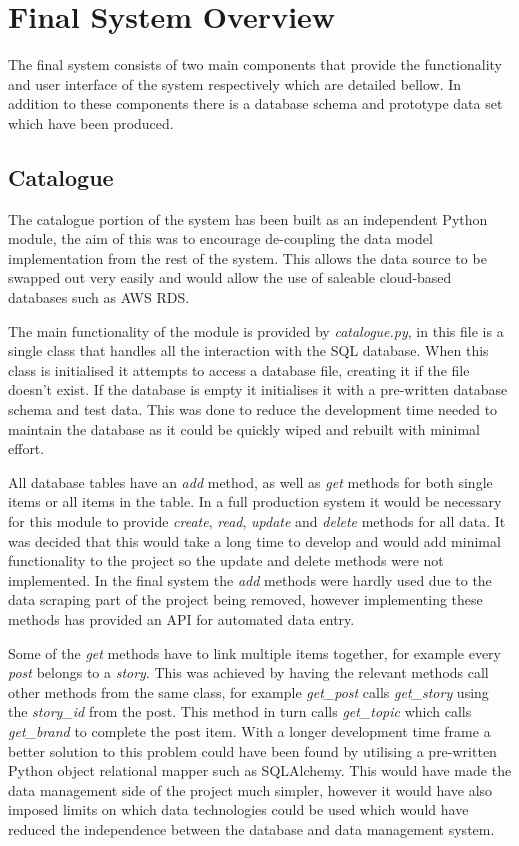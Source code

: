 \documentclass[12pt,titlepage]{article}
\begin{document}
\section{Final System Overview}

  The final system consists of two main components that provide the
  functionality and user interface of the system respectively which are detailed
  bellow. In addition to these components there is a database schema and
  prototype data set which have been produced.

  \subsection{Catalogue}

  The catalogue portion of the system has been built as an independent Python
  module, the aim of this was to encourage de-coupling the data model
  implementation from the rest of the system. This allows the data source to be
  swapped out very easily and would allow the use of saleable cloud-based
  databases such as AWS RDS.

  The main functionality of the module is provided by \textit{catalogue.py}, in
  this file is a single class that handles all the interaction with the SQL
  database. When this class is initialised it attempts to access a database
  file, creating it if the file doesn't exist. If the database is empty it
  initialises it with a pre-written database schema and test data. This was done
  to reduce the development time needed to maintain the database as it could be
  quickly wiped and rebuilt with minimal effort.

  All database tables have an \textit{add} method, as well as \textit{get}
  methods for both single items or all items in the table. In a full production
  system it would be necessary for this module to provide \textit{create},
  \textit{read}, \textit{update} and \textit{delete} methods for all data. It
  was decided that this would take a long time to develop and would add minimal
  functionality to the project so the update and delete methods were not
  implemented. In the final system the \textit{add} methods were hardly used due
  to the data scraping part of the project being removed, however implementing
  these methods has provided an API for automated data entry.

  Some of the \textit{get} methods have to link multiple items together, for
  example every \textit{post} belongs to a \textit{story}. This was achieved by
  having the relevant methods call other methods from the same class, for
  example \textit{get\_post} calls \textit{get\_story} using the \textit{story\_id}
  from the post. This method in turn calls \textit{get\_topic} which calls
  \textit{get\_brand} to complete the post item. With a longer development
  time frame a better solution to this problem could have been found by utilising
  a pre-written Python object relational mapper such as SQLAlchemy. This would
  have made the data management side of the project much simpler, however it
  would have also imposed limits on which data technologies could be used which
  would have reduced the independence between the database and data management
  system.
\end{document}
